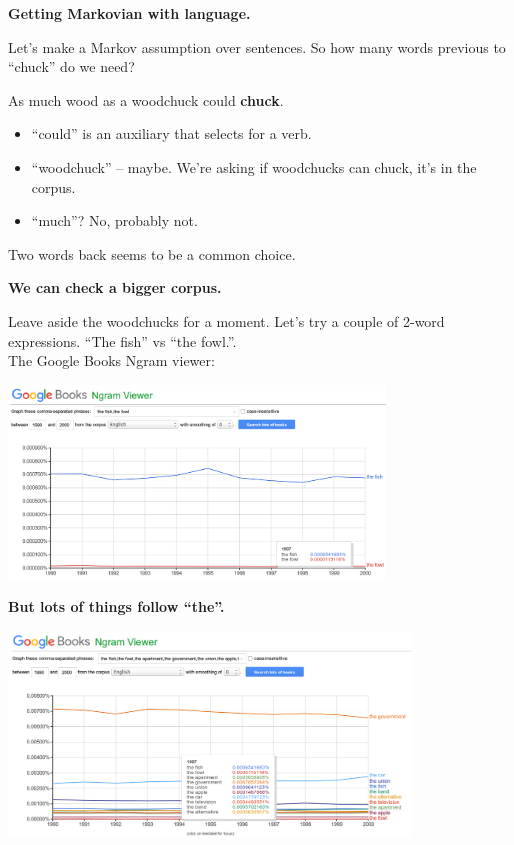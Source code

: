 \documentclass{beamer}
\newcommand{\pagestepalt}[2]{
  \begin{frame}[t]
    \begin{minipage}[t][0.26\textheight][t]{\textwidth}
      \begin{center}
        \huge
        \textbf{#1}
      \end{center}
    \end{minipage}
    
    \begin{minipage}[t][0.7\textheight][c]{\textwidth}
      #2
    \end{minipage}
  \end{frame}
}
\begin{document}

\pagestepalt{Getting Markovian with language.}{
  Let's make a Markov assumption over sentences. So how many words previous
  to ``chuck'' do we need?
  \begin{center}
    \Large As \alert<4>{much} wood as a \alert<3->{woodchuck} \alert<2->{could} \textbf{chuck}. 
  \end{center}
  \pause
  \begin{itemize}
  \item ``could'' is an auxiliary that selects for a verb.\pause
  \item ``woodchuck'' -- maybe. We're asking if woodchucks can chuck, it's in the corpus.\pause
  \item ``much''? No, probably not.
  \end{itemize}\pause
  Two words back seems to be a common choice.
}

\pagestepalt{We can check a bigger corpus.}{
  Leave aside the woodchucks for a moment. Let's try a couple of 2-word
  expressions. ``The fish'' vs ``the fowl.''.\\
  The Google Books Ngram viewer:
  \begin{center}
    \includegraphics[width=0.75\textwidth]{../images/fishvfowl.png}
  \end{center}
}

\pagestepalt{But lots of things follow ``the''.}{
  \begin{center}
    \includegraphics[width=0.8\textwidth]{../images/fishvlots.png}
  \end{center}
}
\end{document}
